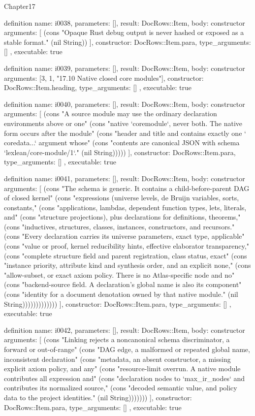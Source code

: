 \begin{lexlean}{Chapter17}
\begin{semanticmodule}
definition{
  name: i0038,
  parameters: [],
  result: DocRows::Item,
  body: constructor{
    arguments: [
      (cons "Opaque Rust debug output is never hashed or exposed as a stable format." (nil String))
    ],
    constructor: DocRows::Item.para,
    type_arguments: []
  },
  executable: true
}

definition{
  name: i0039,
  parameters: [],
  result: DocRows::Item,
  body: constructor{
    arguments: [3, 1, "17.10 Native closed core modules"],
    constructor: DocRows::Item.heading,
    type_arguments: []
  },
  executable: true
}

definition{
  name: i0040,
  parameters: [],
  result: DocRows::Item,
  body: constructor{
    arguments: [
      (cons "A source module may use the ordinary declaration environments above or one" (cons "native `coremodule`, never both. The native form occurs after the module" (cons "header and title and contains exactly one `\\coredata{...}` argument whose" (cons "contents are canonical JSON with schema `lexlean/core-module/1`." (nil String)))))
    ],
    constructor: DocRows::Item.para,
    type_arguments: []
  },
  executable: true
}

definition{
  name: i0041,
  parameters: [],
  result: DocRows::Item,
  body: constructor{
    arguments: [
      (cons "The schema is generic. It contains a child-before-parent DAG of closed kernel" (cons "expressions (universe levels, de Bruijn variables, sorts, constants," (cons "applications, lambdas, dependent function types, lets, literals, and" (cons "structure projections), plus declarations for definitions, theorems," (cons "inductives, structures, classes, instances, constructors, and recursors." (cons "Every declaration carries its universe parameters, exact type, applicable" (cons "value or proof, kernel reducibility hints, effective elaborator transparency," (cons "complete structure field and parent registration, class status, exact" (cons "instance priority, attribute kind and synthesis order, and an explicit none," (cons "allow-subset, or exact axiom policy. There is no Atlas-specific node and no" (cons "backend-source field. A declaration's global name is also its component" (cons "identity for a document denotation owned by that native module." (nil String)))))))))))))
    ],
    constructor: DocRows::Item.para,
    type_arguments: []
  },
  executable: true
}

definition{
  name: i0042,
  parameters: [],
  result: DocRows::Item,
  body: constructor{
    arguments: [
      (cons "Linking rejects a noncanonical schema discriminator, a forward or out-of-range" (cons "DAG edge, a malformed or repeated global name, inconsistent declaration" (cons "metadata, an absent constructor, a missing explicit axiom policy, and any" (cons "resource-limit overrun. A native module contributes all expression and" (cons "declaration nodes to `max_ir_nodes` and contributes its normalized source," (cons "decoded semantic value, and policy data to the project identities." (nil String)))))))
    ],
    constructor: DocRows::Item.para,
    type_arguments: []
  },
  executable: true
}


\end{semanticmodule}
\end{lexlean}
